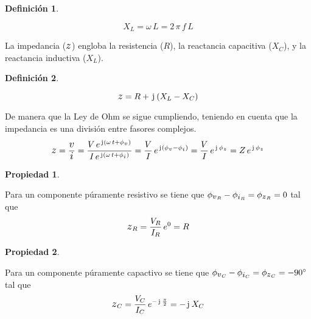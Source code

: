 \documentclass[a5paper,12pt,twoside]{book}
\newtheorem{defn}{{Definición}}[chapter]
\newtheorem{prop}{{Propiedad}}[chapter]
\begin{document}
\begin{mdframed}[style=MyFrame1]
    \begin{defn}
    \end{defn}
    \begin{equation*}
        X_L = \omega \, L = 2 \, \pi \, f \, L
    \end{equation*}
\end{mdframed}

La impedancia ($\impedance$) engloba la resistencia ($R$), la reactancia capacitiva ($X_C$), y la reactancia inductiva ($X_L$).

\begin{mdframed}[style=MyFrame1]
    \begin{defn}
    \end{defn}
    \begin{equation*}
        \impedance = R + \iu \inParentheses{X_L - X_C}
    \end{equation*}
\end{mdframed}

De manera que la Ley de Ohm se sigue cumpliendo, teniendo en cuenta que la impedancia es una división entre fasores complejos.
\begin{equation*}
    \impedance = \frac{\voltage}{\current}
    = \frac{V \, e^{\iu \inParentheses{\omega \, t + \phi_\voltage}}}{I \, e^{\iu \inParentheses{\omega \, t + \phi_\current}}}
    = \frac{V}{I} \, e^{\iu \inParentheses{\phi_\voltage - \phi_\current}}
    = \frac{V}{I} \, e^{\iu \, \phi_\impedance}
    = Z \, e^{\iu \, \phi_\impedance}
\end{equation*}

\begin{mdframed}[style=MyFrame1]
    \begin{prop}
    \end{prop}
    Para un componente púramente resistivo se tiene que $\phi_{\voltage_R} - \phi_{\current_R} = \phi_{\impedance_R} = 0$ tal que
    \begin{equation*}
        \impedance_R = \frac{V_R}{I_R} \, e^0 = R
    \end{equation*}
\end{mdframed}

\begin{mdframed}[style=MyFrame1]
    \begin{prop}
    \end{prop}
    Para un componente púramente capactivo se tiene que $\phi_{\voltage_C} - \phi_{\current_C} = \phi_{\impedance_C} = - \ang{90}$ tal que
    \begin{equation*}
        \impedance_C = \frac{V_C}{I_C} \, e^{- \iu \, \frac{\pi}{2}} = - \iu \, X_C
    \end{equation*}
\end{mdframed}
\end{document}
